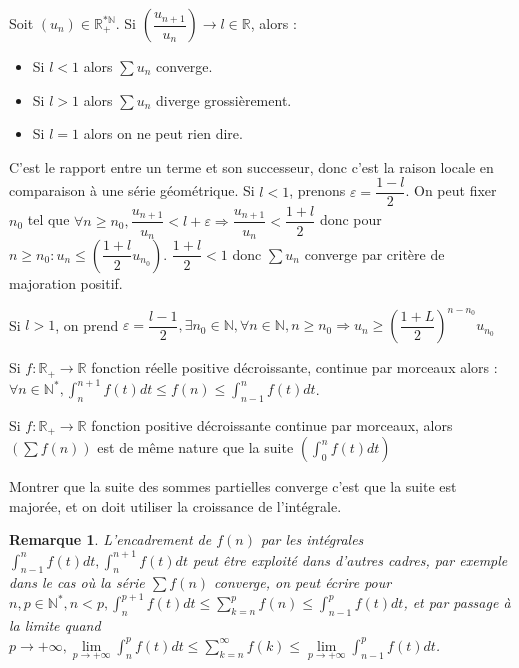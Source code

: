 \documentclass[a4paper,12pt]{book}
\newcommand{\Thr}[2]{\begin{tcolorbox}[sharp corners, colback=white,colframe=red!90!black!75, title=Théorème : #1]#2\end{tcolorbox}}
\newcommand{\Prop}[2]{\begin{tcolorbox}[sharp corners, colback=white,colframe=red!90!black!75, title=Proposition : #1]#2\end{tcolorbox}}
\newcommand{\Pre}[1]{\begin{tcolorbox}[sharp corners, colback=white,colframe=green!60!green!30!black!75, title=Preuve]#1\end{tcolorbox}}
\newtheorem{Rem}{Remarque}[section]
\def\R{\mathbb{R}}
\def\N{\mathbb{N}}
\begin{document}
\Thr{Critère de d'Alembert}{Soit $(u_n)\in\R_+^{*\N}$. Si $\left(\dfrac{u_{n+1}}{u_n}\right)\to l\in\R$, alors :\begin{itemize}
\item Si $l<1$ alors $\sum u_n$ converge.
\item Si $l>1$ alors $\sum u_n$ diverge grossièrement.
\item Si $l=1$ alors on ne peut rien dire.\end{itemize}}
\Pre{C'est le rapport entre un terme et son successeur, donc c'est la raison locale en comparaison à une série géométrique. Si $l<1$, prenons $\varepsilon = \dfrac{1-l}{2}$. On peut fixer $n_0$ tel que $\forall n\geq n_0, \dfrac{u_{n+1}}{u_n}< l+\varepsilon \Rightarrow \dfrac{u_{n+1}}{u_n}<\dfrac{1+l}{2}$ donc pour $n\geq n_0 : u_n \leq \left(\dfrac{1+l}{2}u_{n_0}\right)$. $\dfrac{1+l}{2}<1$ donc $\sum u_n $ converge par critère de majoration positif.
\par Si $l>1$, on prend $\varepsilon = \dfrac{l-1}{2}, \exists n_0\in\N,\forall n\in\N, n\geq n_0 \Rightarrow u_n \geq (\dfrac{1+L}{2})^{n-n_0}u_{n_0}$}
\Prop{Comparaisons séries-intégrales}{Si $f:\R_+\to\R$ fonction réelle positive décroissante, continue par morceaux alors : $\forall n\in\N^*, \int_n^{n+1}f(t)dt\leq f(n)\leq \int_{n-1}^nf(t)dt$.}
\Thr{Comparaisons séries-intégrales}{Si $f:\R_+\to\R$ fonction positive décroissante continue par morceaux, alors $\left(\sum f(n)\right)$ est de même nature que la suite $\left(\int_0^nf(t)dt\right)$}
\Pre{Montrer que la suite des sommes partielles converge c'est que la suite est majorée, et on doit utiliser la croissance de l'intégrale.}
\begin{Rem}
L'encadrement de $f(n)$ par les intégrales $\int_{n-1}^nf(t)dt, \int_n^{n+1}f(t)dt$ peut être exploité dans d'autres cadres, par exemple dans le cas où la série $\sum f(n)$ converge, on peut écrire pour $n,p\in\N^*, n< p, \int_n^{p+1}f(t)dt\leq\sum\limits_{k=n}^p f(n)\leq \int_{n-1}^pf(t)dt$, et par passage à la limite quand $p\to+\infty, \lim\limits_{p\to+\infty}\int_n^pf(t)dt\leq\sum\limits_{k=n}^\infty f(k)\leq\lim\limits_{p\to+\infty}\int_{n-1}^pf(t)dt$.
\end{Rem}
\end{document}
